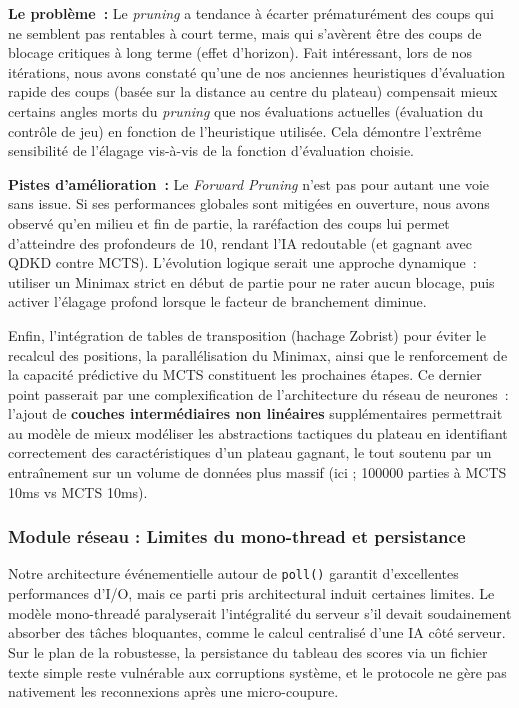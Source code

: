 \documentclass[a4paper]{article}
\begin{document}
\textbf{Le problème~:} Le \textit{pruning} a tendance à écarter prématurément des coups qui ne semblent pas rentables à court terme, mais qui s'avèrent être des coups de blocage critiques à long terme (effet d'horizon). Fait intéressant, lors de nos itérations, nous avons constaté qu'une de nos anciennes heuristiques d'évaluation rapide des coups (basée sur la distance au centre du plateau) compensait mieux certains angles morts du \textit{pruning} que nos évaluations actuelles (évaluation du contrôle de jeu) en fonction de l'heuristique utilisée. Cela démontre l'extrême sensibilité de l'élagage vis-à-vis de la fonction d'évaluation choisie.

\textbf{Pistes d'amélioration~:} Le \textit{Forward Pruning} n'est pas pour autant une voie sans issue. Si ses performances globales sont mitigées en ouverture, nous avons observé qu'en milieu et fin de partie, la raréfaction des coups lui permet d'atteindre des profondeurs de 10, rendant l'IA redoutable (et gagnant avec QDKD contre MCTS). L'évolution logique serait une approche dynamique~: utiliser un Minimax strict en début de partie pour ne rater aucun blocage, puis activer l'élagage profond lorsque le facteur de branchement diminue. 

Enfin, l'intégration de tables de transposition (hachage Zobrist) pour éviter le recalcul des positions, la parallélisation du Minimax, ainsi que le renforcement de la capacité prédictive du MCTS constituent les prochaines étapes. Ce dernier point passerait par une complexification de l'architecture du réseau de neurones~: l'ajout de \textbf{couches intermédiaires non linéaires} supplémentaires permettrait au modèle de mieux modéliser les abstractions tactiques du plateau en identifiant correctement des caractéristiques d'un plateau gagnant, le tout soutenu par un entraînement sur un volume de données plus massif (ici ; 100000 parties à MCTS 10ms vs MCTS 10ms).

\subsubsection{Module réseau : Limites du mono-thread et persistance}

Notre architecture événementielle autour de \texttt{poll()} garantit d'excellentes performances d'I/O, mais ce parti pris architectural induit certaines limites. Le modèle mono-threadé paralyserait l'intégralité du serveur s'il devait soudainement absorber des tâches bloquantes, comme le calcul centralisé d'une IA côté serveur. Sur le plan de la robustesse, la persistance du tableau des scores via un fichier texte simple reste vulnérable aux corruptions système, et le protocole ne gère pas nativement les reconnexions après une micro-coupure.
\end{document}
